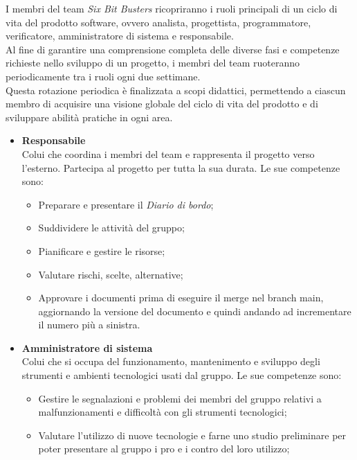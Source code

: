 I membri del team \textit{Six Bit Busters} ricopriranno i ruoli principali di un
ciclo di vita del prodotto software, ovvero analista, progettista,
programmatore, verificatore, amministratore di sistema e responsabile. \\ Al
fine di garantire una comprensione completa delle diverse fasi e competenze
richieste nello sviluppo di un progetto, i membri del team ruoteranno
periodicamente tra i ruoli ogni due settimane. \\Questa rotazione periodica è
finalizzata a scopi didattici, permettendo a ciascun membro di acquisire una
visione globale del ciclo di vita del prodotto e di sviluppare abilità pratiche
in ogni area.
\begin{itemize}
    \item \textbf{Responsabile}\\
          Colui che coordina i membri del team e rappresenta il progetto verso l'esterno.
          Partecipa al progetto per tutta la sua durata.
          Le sue competenze sono:
          \begin{itemize}
              \item Preparare e presentare il \textit{Diario di bordo};
              \item Suddividere le attività del gruppo;
              \item Pianificare e gestire le risorse;
              \item Valutare rischi, scelte, alternative;
              \item Approvare i documenti prima di eseguire il merge nel branch main, aggiornando
                    la versione del documento e quindi andando ad incrementare il numero più a
                    sinistra.
          \end{itemize}
    \item \textbf{Amministratore di sistema}\\
          Colui che si occupa del funzionamento, mantenimento e sviluppo degli strumenti e ambienti tecnologici
          usati dal gruppo.
          Le sue competenze sono:
          \begin{itemize}
              \item Gestire le segnalazioni e problemi dei membri del gruppo relativi a
                    malfunzionamenti e difficoltà con gli strumenti tecnologici;
              \item Valutare l'utilizzo di nuove tecnologie e farne uno studio preliminare per
                    poter presentare al gruppo i pro e i contro del loro utilizzo;

\end{itemize}
\end{itemize}
